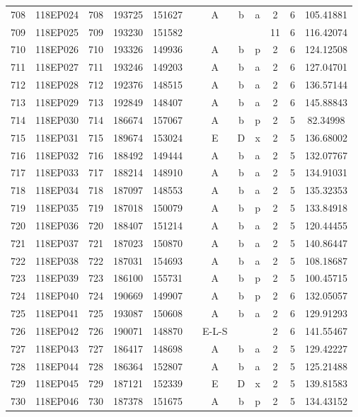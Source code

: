 \begin{tabular}{|*{12}{c|}}
708 & 118EP024 & 708 & 193725 & 151627 &  & A & b & a & 2 & 6 & 105.41881 \\ 
709 & 118EP025 & 709 & 193230 & 151582 &  &  &  &  & 11 & 6 & 116.42074 \\ 
710 & 118EP026 & 710 & 193326 & 149936 &  & A & b & p & 2 & 6 & 124.12508 \\ 
711 & 118EP027 & 711 & 193246 & 149203 &  & A & b & a & 2 & 6 & 127.04701 \\ 
712 & 118EP028 & 712 & 192376 & 148515 &  & A & b & a & 2 & 6 & 136.57144 \\ 
713 & 118EP029 & 713 & 192849 & 148407 &  & A & b & a & 2 & 6 & 145.88843 \\ 
714 & 118EP030 & 714 & 186674 & 157067 &  & A & b & p & 2 & 5 & 82.34998 \\ 
715 & 118EP031 & 715 & 189674 & 153024 &  & E & D & x & 2 & 5 & 136.68002 \\ 
716 & 118EP032 & 716 & 188492 & 149444 &  & A & b & a & 2 & 5 & 132.07767 \\ 
717 & 118EP033 & 717 & 188214 & 148910 &  & A & b & a & 2 & 5 & 134.91031 \\ 
718 & 118EP034 & 718 & 187097 & 148553 &  & A & b & a & 2 & 5 & 135.32353 \\ 
719 & 118EP035 & 719 & 187018 & 150079 &  & A & b & p & 2 & 5 & 133.84918 \\ 
720 & 118EP036 & 720 & 188407 & 151214 &  & A & b & a & 2 & 5 & 120.44455 \\ 
721 & 118EP037 & 721 & 187023 & 150870 &  & A & b & a & 2 & 5 & 140.86447 \\ 
722 & 118EP038 & 722 & 187031 & 154693 &  & A & b & a & 2 & 5 & 108.18687 \\ 
723 & 118EP039 & 723 & 186100 & 155731 &  & A & b & p & 2 & 5 & 100.45715 \\ 
724 & 118EP040 & 724 & 190669 & 149907 &  & A & b & p & 2 & 6 & 132.05057 \\ 
725 & 118EP041 & 725 & 193087 & 150608 &  & A & b & a & 2 & 6 & 129.91293 \\ 
726 & 118EP042 & 726 & 190071 & 148870 &  & E-L-S &  &  & 2 & 6 & 141.55467 \\ 
727 & 118EP043 & 727 & 186417 & 148698 &  & A & b & a & 2 & 5 & 129.42227 \\ 
728 & 118EP044 & 728 & 186364 & 152807 &  & A & b & a & 2 & 5 & 125.21488 \\ 
729 & 118EP045 & 729 & 187121 & 152339 &  & E & D & x & 2 & 5 & 139.81583 \\ 
730 & 118EP046 & 730 & 187378 & 151675 &  & A & b & p & 2 & 5 & 134.43152 \\ 

\end{tabular}
